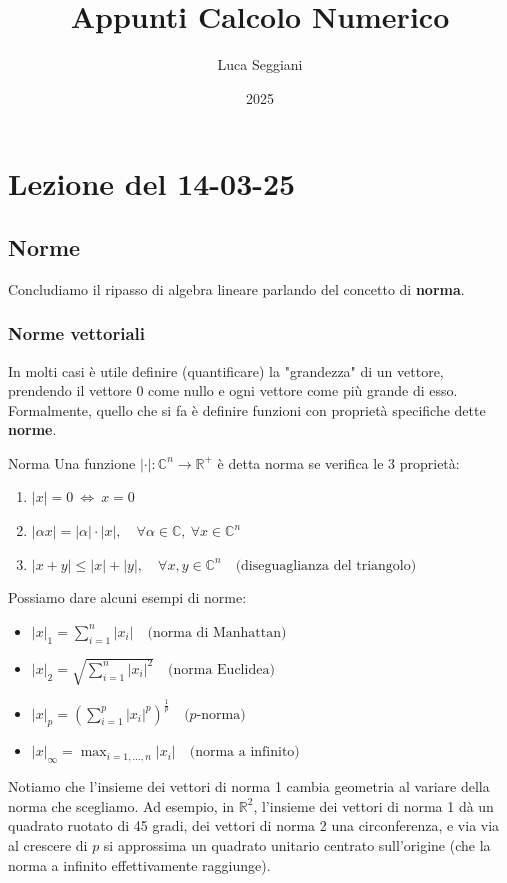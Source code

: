 \documentclass[a4paper,11pt]{article}
\title{Appunti Calcolo Numerico}
\author{Luca Seggiani}
\date{2025}
\begin{document}
\section{Lezione del 14-03-25}

\thispagestyle{empty}
\pagestyle{fancy}

\subsection{Norme}
Concludiamo il ripasso di algebra lineare parlando del concetto di \textbf{norma}.

\subsubsection{Norme vettoriali}
In molti casi è utile definire (quantificare) la "grandezza" di un vettore, prendendo il vettore 0 come nullo e ogni vettore come più grande di esso.
Formalmente, quello che si fa è definire funzioni con proprietà specifiche dette \textbf{norme}.

\begin{definition}{Norma}
	Una funzione $|\cdot|: \mathbb{C}^n \rightarrow \mathbb{R}^+$ è detta norma se verifica le 3 proprietà:
	\begin{enumerate}
		\item $|x| = 0 \ \Leftrightarrow \ x = 0$
		\item $|\alpha x| = |\alpha| \cdot |x|, \quad \forall \alpha \in \mathbb{C}, \ \forall x \in \mathbb{C}^n$
		\item $|x + y| \leq |x| + |y|, \quad \forall x, y \in \mathbb{C}^n \quad \text{(diseguaglianza del triangolo)}$ 
	\end{enumerate}
\end{definition}

Possiamo dare alcuni esempi di norme:
\begin{itemize}
	\item $|x|_1 = \sum_{i=1}^n |x_i| \quad \text{(norma di Manhattan)}$
	\item $|x|_2 = \sqrt{\sum_{i=1}^n |x_i|^2} \quad \text{(norma Euclidea)}$
	\item $|x|_p = \left( \sum_{i=1}^p |x_i|^p \right)^\frac{1}{p} \quad \text{($p$-norma)}$
	\item $|x|_\infty = \max_{i = 1, ..., n} |x_i| \quad \text{(norma a infinito)}$
\end{itemize}

Notiamo che l'insieme dei vettori di norma 1 cambia geometria al variare della norma che scegliamo.
Ad esempio, in $\mathbb{R}^2$, l'insieme dei vettori di norma 1 dà un quadrato ruotato di 45 gradi, dei vettori di norma 2 una circonferenza, e via via al crescere di $p$ si approssima un quadrato unitario centrato sull'origine (che la norma a infinito effettivamente raggiunge).
\end{document}
